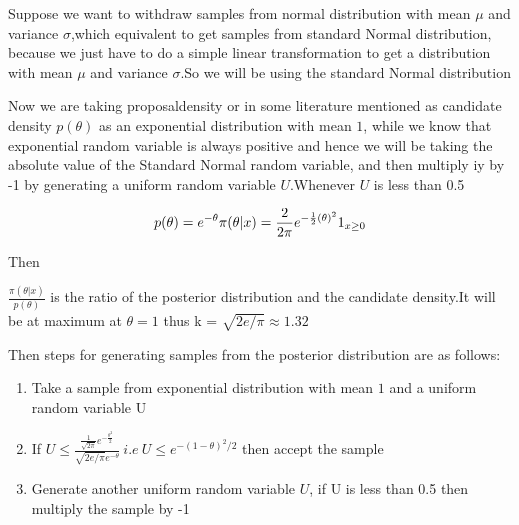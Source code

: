 \documentclass[
]{article}
\providecommand{\tightlist}{%
  \setlength{\itemsep}{0pt}\setlength{\parskip}{0pt}}
\begin{document}
Suppose we want to withdraw samples from normal distribution with mean
\(\mu\) and variance \(\sigma\),which equivalent to get samples from
standard Normal distribution, because we just have to do a simple linear
transformation to get a distribution with mean \(\mu\) and variance
\(\sigma\).So we will be using the standard Normal distribution

Now we are taking proposaldensity or in some literature mentioned as
candidate density \(p(\theta)\) as an exponential distribution with mean
\(1\), while we know that exponential random variable is always positive
and hence we will be taking the absolute value of the Standard Normal
random variable, and then multiply iy by -1 by generating a uniform
random variable \(U\).Whenever \(U\) is less than 0.5

\[
p(\theta) = e^{-\theta}  \\
\pi(\theta|x) = \frac{2}{2\pi}  e^{-\frac{1}{2}(\theta)^2}1_{x \geq0}
\]

Then

\(\frac{\pi(\theta|x)}{p(\theta)}\) is the ratio of the posterior
distribution and the candidate density.It will be at maximum at
\(\theta = 1\) thus k = \(\sqrt{2e / \pi} \approx 1.32\)

Then steps for generating samples from the posterior distribution are as
follows:

\begin{enumerate}
\def\labelenumi{\arabic{enumi}.}
\tightlist
\item
  Take a sample from exponential distribution with mean \(1\) and a
  uniform random variable U
\item
  If
  \(U \leq \frac{\frac{1}{\sqrt{2\pi}}e^{-\frac{\theta^2}{2}}}{\sqrt{2e/\pi} e^{-\theta}} \ i.e \ U \leq e^{-(1 -\theta)^2/2}\)
  then accept the sample
\item
  Generate another uniform random variable \(U\), if U is less than 0.5
  then multiply the sample by -1
\end{enumerate}
\end{document}
